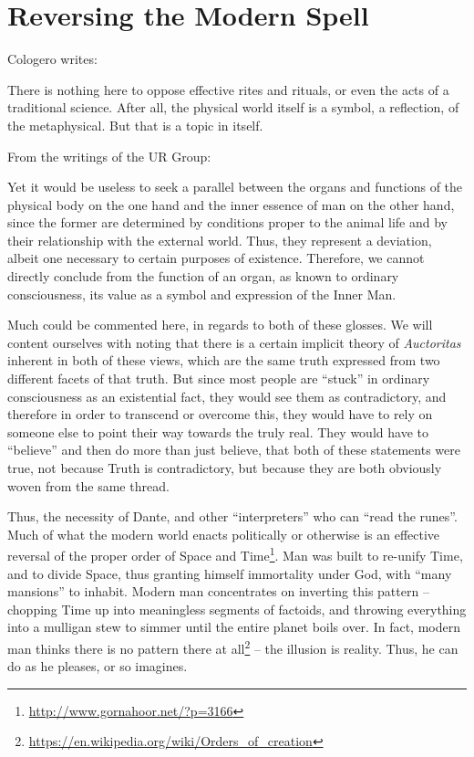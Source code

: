 \section{Reversing the Modern Spell}

Cologero writes:

\begin{quotex}
There is nothing here to oppose effective rites and rituals, or even the acts of a traditional science. After all, the physical world itself is a symbol, a reflection, of the metaphysical. But that is a topic in itself.
\end{quotex}


From the writings of the UR Group:

\begin{quotex}
Yet it would be useless to seek a parallel between the organs and functions of the physical body on the one hand and the inner essence of man on the other hand, since the former are determined by conditions proper to the animal life and by their relationship with the external world. Thus, they represent a deviation, albeit one necessary to certain purposes of existence. Therefore, we cannot directly conclude from the function of an organ, as known to ordinary consciousness, its value as a symbol and expression of the Inner Man.
\end{quotex}


Much could be commented here, in regards to both of these glosses. We will content ourselves with noting that there is a certain implicit theory of \emph{Auctoritas} inherent in both of these views, which are the same truth expressed from two different facets of that truth. But since most people are ``stuck'' in ordinary consciousness as an existential fact, they would see them as contradictory, and therefore in order to transcend or overcome this, they would have to rely on someone else to point their way towards the truly real. They would have to ``believe'' and then do more than just believe, that both of these statements were true, not because Truth is contradictory, but because they are both obviously woven from the same thread.

Thus, the necessity of Dante, and other ``interpreters'' who can ``read the runes''. Much of what the modern world enacts politically or otherwise is an effective reversal of the proper order of Space and Time\footnote{\url{http://www.gornahoor.net/?p=3166}}. Man was built to re-unify Time, and to divide Space, thus granting himself immortality under God, with ``many mansions'' to inhabit. Modern man concentrates on inverting this pattern -- chopping Time up into meaningless segments of factoids, and throwing everything into a mulligan stew to simmer until the entire planet boils over. In fact, modern man thinks there is no pattern there at all\footnote{\url{https://en.wikipedia.org/wiki/Orders_of_creation}} -- the illusion is reality. Thus, he can do as he pleases, or so imagines.

